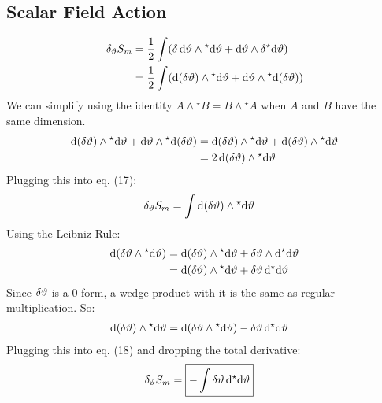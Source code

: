 \documentclass[12pt]{article}
\newcommand{\hodge}{{^\star}}
\begin{document}
\subsection{Scalar Field Action}
\begin{align}
  \var_\vartheta{S_m} &= \frac{1}{2} \int (\var{\dd{\vartheta}} \wedge \hodge{\dd{\vartheta}} + \dd{\vartheta} \wedge \var{\hodge{\dd{\vartheta}}}) \nonumber \\
  &= \frac{1}{2} \int (\dd(\var{\vartheta}) \wedge \hodge{\dd{\vartheta}} + \dd{\vartheta} \wedge \hodge{\dd(\var{\vartheta})})
\end{align}
We can simplify using the identity $A \wedge \hodge B = B \wedge \hodge A$ when $A$ and $B$ have the same dimension.
\begin{align*}
  \dd(\var{\vartheta}) \wedge \hodge{\dd{\vartheta}} + \dd{\vartheta} \wedge \hodge{\dd(\var{\vartheta})} &= \dd(\var{\vartheta}) \wedge \hodge{\dd{\vartheta}} + \dd(\var{\vartheta}) \wedge \hodge{\dd{\vartheta}} \\
  &= 2\dd(\var{\vartheta}) \wedge \hodge{\dd{\vartheta}}
\end{align*}
Plugging this into eq. (17):
\begin{align}
  \var_\vartheta{S_m} &= \int \dd(\var{\vartheta}) \wedge \hodge{\dd{\vartheta}}
\end{align}
Using the Leibniz Rule:
\begin{align*}
  \dd(\var{\vartheta} \wedge \hodge{\dd{\vartheta}}) &= \dd(\var{\vartheta}) \wedge \hodge{\dd{\vartheta}} + \var{\vartheta} \wedge \dd{\hodge{\dd{\vartheta}}} \\
  &= \dd(\var{\vartheta}) \wedge \hodge{\dd{\vartheta}} + \var{\vartheta}\dd{\hodge{\dd{\vartheta}}}
\end{align*}
Since $\var{\vartheta}$ is a 0-form, a wedge product with it is the same as regular multiplication. So:
\begin{align*}
  \dd(\var{\vartheta}) \wedge \hodge{\dd{\vartheta}} &= \dd(\var{\vartheta} \wedge \hodge{\dd{\vartheta}}) - \var{\vartheta}\dd{\hodge{\dd{\vartheta}}}
\end{align*}
Plugging this into eq. (18) and dropping the total derivative:
\begin{align}
  \var_\vartheta{S_m} &= \boxed{- \int \var{\vartheta}\dd{\hodge{\dd{\vartheta}}}}
\end{align}
\end{document}
